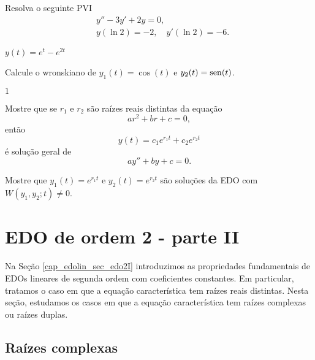 \begin{exer}
  Resolva o seguinte PVI
  \begin{align}
    &y'' - 3y' + 2y = 0,\\
    &y(\ln 2) = -2,\quad y'(\ln 2) = -6.
  \end{align}
\end{exer}
\begin{resp}
  $y(t) = e^t - e^{2t}$
\end{resp}

\begin{exer}
  Calcule o wronskiano de $y_1(t) = \cos(t)$ e $y_2(t) = \operatorname{sen}(t)$.
\end{exer}
\begin{resp}
  $1$
\end{resp}

\begin{exer}
  Mostre que se $r_1$ e $r_2$ são raízes reais distintas da equação
  \begin{equation}
    ar^2 + br + c = 0,
  \end{equation}
  então
  \begin{equation}
    y(t) = c_1e^{r_1t} + c_2e^{r_2t}
  \end{equation}
  é solução geral de
  \begin{equation}
    ay'' + by + c = 0.
  \end{equation}
\end{exer}
\begin{resp}
  Mostre que $y_1(t) = e^{r_1t}$ e $y_2(t) = e^{r_2t}$ são soluções da EDO com $W(y_1,y_2; t) \neq 0$.
\end{resp}


\section{EDO de ordem 2 - parte II}\label{cap_edolin_sec_edo2II}

Na Seção \ref{cap_edolin_sec_edo2I} introduzimos as propriedades fundamentais de EDOs lineares de segunda ordem com coeficientes constantes. Em particular, tratamos o caso em que a equação característica tem raízes reais distintas. Nesta seção, estudamos os casos em que a equação característica tem raízes complexas ou raízes duplas.

\subsection{Raízes complexas}

